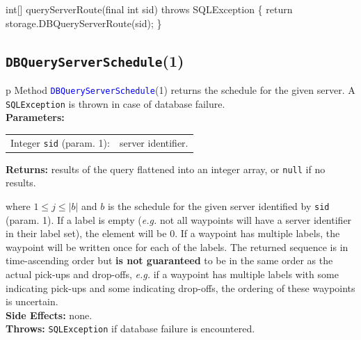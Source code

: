 \nwenddocs{}\endmoddef{}
int[] queryServerRoute(final int sid) throws SQLException \{
  return storage.DBQueryServerRoute(sid);
\}
\eatline
{}\nwendcode{}\nwdocspar
\subsection{\texttt{DBQueryServerSchedule}(1)}
\begin{tabular}{p{\textwidth}}
\toprule
{}
Method \textcolor{blue}{{\tt{}\protect{}DBQueryServerSchedule}}(1) returns the schedule
for the given server.
A {\tt{}SQLException} is thrown in case of database failure.\\
\midrule
\textbf{Parameters:} \\
\begin{tabular}{lp{116mm}}
Integer {\tt{}sid} (param. 1):&server identifier.\\
\end{tabular}
\textbf{Returns:} results of the query flattened into an integer array,
or {\tt{}null} if no results.


where $1\leq j\leq |b|$ and $b$ is the schedule for the
given server  identified by {\tt{}sid} (param. 1).
If a label is empty (\textit{e.g.} not all waypoints will have a server
identifier in their label set), the element will be 0. If a waypoint has
multiple labels, the waypoint will be written once for each of the labels.
The returned sequence is in time-ascending order but \textbf{is not guaranteed}
to be in the same order as the actual pick-ups and drop-offs, \textit{e.g.} if a
waypoint has multiple labels with some indicating pick-ups and some indicating
drop-offs, the ordering of these waypoints is uncertain.\\
\textbf{Side Effects:} none.\\
\textbf{Throws:} {\tt{}SQLException} if database failure is encountered.\\
\bottomrule
\end{tabular}
